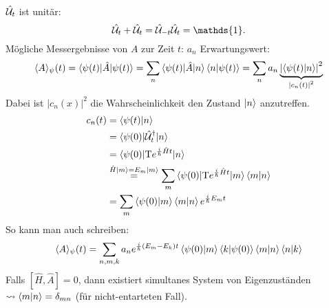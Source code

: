 		$\hat{\mathcal{U}}_t$ ist unitär: 		
			\begin{equation*}
				\hat{\U}_t + \hat{\U}_t = \hat{\U}_{-t} \hat{\U}_t = \mathds{1}.
			\end{equation*}
		Mögliche Messergebnisse von $A$ zur Zeit $t$: $a_n$
		Erwartungswert:	
			\begin{align*}
				\langle {A} \rangle_\psi (t) = \braket{\psi(t) | \hat{A} | \psi(t)} = \sum_n \braket{\psi(t) | \hat{A} | n} \braket{n | \psi(t)} = \sum_n a_n 
				\underbrace{\left| \braket{\psi(t) | n} \right|^2}_{\substack{|c_n(t)|^2}}				
			\end{align*}
		Dabei ist $|c_n(x)|^2$ die Wahrscheinlichkeit den Zustand $\ket{n}$ anzutreffen.
			\begin{align*}
				c_n(t) &= \braket{\psi(t) | n} \\
				&= \braket{\psi(0) | \hat{\mathcal{U}}_t^\dagger | n} \\
				&= \braket{\psi(0) | \text{T} e^{\frac{i}{\hbar} \hat{H} t} | n} \\
				& \overset{\hat{H}\ket{m} = E_m \ket{m}}{=} 
				\sum_m \braket{\psi(0) | \text{T} e^{ \frac{i}{\hbar} \hat{H} t} | m} \braket{m | n} \\
				&= \sum_m \braket{\psi(0) | m} \braket{m | n} e^{ \frac{i}{\hbar} E_m t}
			\end{align*}
		So kann man auch schreiben:
			\begin{equation*}
				\langle {A} \rangle_\psi (t) =
				\sum_{n,m,k} a_n e^{ \frac{i}{\hbar} (E_m - E_k) t} 
				\braket{\psi(0) | m} \braket{k | \psi(0)} \braket{m | n} \braket{n | k}
			\end{equation*}
		Falls $[\hat{H} , \hat{A}] = 0$, dann existiert simultanes System von Eigenzuständen $\leadsto \braket{m | n} = \delta_{mn}$ (für nicht-entarteten Fall).